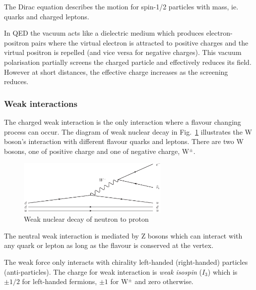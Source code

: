 The Dirac equation describes the motion for spin-1/2 particles with mass, ie. quarks and charged leptons.



In QED the vacuum acts like a dielectric medium which produces electron-positron pairs where the virtual electron is attracted to positive charges and the virtual positron is repelled (and vice versa for negative charges). This vacuum polarisation partially screens the charged particle and effectively reduces its field. However at short distances, the effective charge increases as the screening reduces.

\subsubsection{Weak interactions}

The charged weak interaction is the only interaction where a flavour changing process can occur. The diagram of weak nuclear decay in Fig.~\ref{fig:QEDvertex} illustrates the W boson's interaction with different flavour quarks and leptons. There are two W bosons, one of positive charge and one of negative charge, W$^{\pm}$.


\begin{figure}[ht!]
\begin{center}
    \includegraphics[width=0.65\textwidth]{images/Theory/weakDecay2.eps}
    \caption{Weak nuclear decay of neutron to proton}
    \label{fig:QEDvertex}
\end{center}
\end{figure}

The neutral weak interaction is mediated by Z bosons which can interact with any quark or lepton as long as the flavour is conserved at the vertex.

The weak force only interacts with chirality left-handed (right-handed) particles (anti-particles).
The charge for weak interaction is \emph{weak isospin} ($I_{3}$) which is $\pm1/2$ for left-handed fermions, $\pm1$ for W$^{\pm}$ and zero otherwise.

